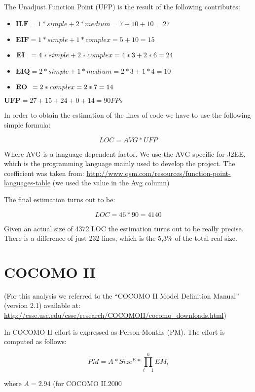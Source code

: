 \documentclass[10pt,a4paper,titlepage]{article}
\begin{document}
The Unadjust Function Point (UFP) is the result of the following contributes: 
\begin{itemize}
\item $\textbf{ILF} = 1*simple+2*medium=7+10+10=27$

\item $\textbf{EIF} = 1*simple+1*complex=5+10=15$

\item $\textbf{EI\hspace{7pt}} = 4*simple+2*complex=4*3+2*6=24$

\item $\textbf{EIQ} = 2*simple+1*medium=2*3+1*4=10$

\item $\textbf{EO\hspace{5pt}} = 2*complex=2*7=14$
\end{itemize}

$\textbf{UFP} = 27+15+24+0+14 = 90 {FPs}$

In order to obtain the estimation of the lines of code we have to use the following simple formula:

\[LOC= AVG * UFP\]
 
Where AVG is a language dependent factor.
We use the AVG specific for J2EE, which is the programming language mainly used to develop the project. The coefficient was taken from: \url{http://www.qsm.com/resources/function-point-languages-table} (we used the value in the Avg column) 
 
 
The final estimation turns out to be: 

\[LOC = 46*90=4140\]
 
Given an actual size of 4372 LOC the estimation turns out to be really precise.  
There is a difference of just 232 lines, which is the 5,3\% of the total real size. 

\pagebreak
\part{COCOMO II}
(For this analysis we referred to the “COCOMO II Model Definition Manual” (version 2.1) available at: \url{http://csse.usc.edu/csse/research/COCOMOII/cocomo_downloads.html})

In COCOMO II effort is expressed as Person-Months (PM). The effort is computed as follows:

\[PM = A * Size^E * \prod\limits_{i=1}^n {EM_i}\]
\begin{center}where $A=2.94$ (for COCOMO II.2000\end{center}
\end{document}
